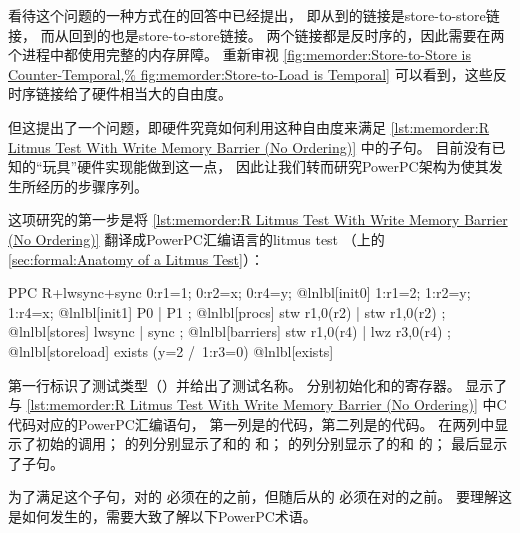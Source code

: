 看待这个问题的一种方式在\QuickQuizARef{\MemorderQQLitmusTestR}的回答中已经提出，
即从到的链接是store-to-store链接，
而从回到的也是store-to-store链接。
两个链接都是反时序的，因此需要在两个进程中都使用完整的内存屏障。
重新审视
\cref{fig:memorder:Store-to-Store is Counter-Temporal,%
fig:memorder:Store-to-Load is Temporal}
可以看到，这些反时序链接给了硬件相当大的自由度。

但这提出了一个问题，即硬件究竟如何利用这种自由度来满足
\cref{lst:memorder:R Litmus Test With Write Memory Barrier (No Ordering)}
中的子句。
目前没有已知的``玩具''硬件实现能做到这一点，
因此让我们转而研究PowerPC架构为使其发生所经历的步骤序列。

这项研究的第一步是将
\cref{lst:memorder:R Litmus Test With Write Memory Barrier (No Ordering)}
翻译成PowerPC汇编语言的litmus test
（上的
\cref{sec:formal:Anatomy of a Litmus Test}）：

\begin{fcvlabel}
\begin{VerbatimN}[samepage=true,commandchars=\@\[\]]
PPC R+lwsync+sync
{
0:r1=1; 0:r2=x; 0:r4=y;		@lnlbl[init0]
1:r1=2; 1:r2=y; 1:r4=x;		@lnlbl[init1]
}
 P0           | P1           ;	@lnlbl[procs]
 stw r1,0(r2) | stw r1,0(r2) ;	@lnlbl[stores]
 lwsync       | sync         ;	@lnlbl[barriers]
 stw r1,0(r4) | lwz r3,0(r4) ;	@lnlbl[storeload]
exists (y=2 /\ 1:r3=0)		@lnlbl[exists]
\end{VerbatimN}
\end{fcvlabel}

\begin{fcvref}
第一行标识了测试类型（）并给出了测试名称。
分别初始化和的寄存器。
显示了与
\cref{lst:memorder:R Litmus Test With Write Memory Barrier (No Ordering)}
中C代码对应的PowerPC汇编语句，
第一列是的代码，第二列是的代码。
在两列中显示了初始的调用；
的列分别显示了和的
和；
的列分别显示了的和
的；
最后显示了子句。
\end{fcvref}

为了满足这个子句，对的
必须在的之前，但随后从的
必须在对的之前。
要理解这是如何发生的，需要大致了解以下PowerPC术语。

